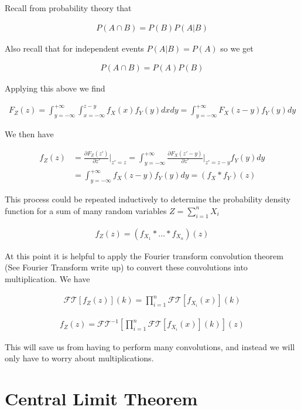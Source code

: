 \documentclass[12pt]{article}
\begin{document}
Recall from probability theory that

\begin{align}
P(A \cap B) = P(B)P(A\vert B)
\end{align}

Also recall that for independent events $P(A\vert B) = P(A)$ so we get

\begin{align}
P(A \cap B) = P(A)P(B)
\end{align}

Applying this above we find

\begin{align}
F_Z(z) = \int_{y=-\infty}^{+\infty}\int_{x=-\infty}^{z-y}f_X(x)f_Y(y)dxdy = \int_{y=-\infty}^{+\infty}F_X(z-y)f_Y(y)dy
\end{align}

We then have

\begin{align}
f_Z(z) &= \frac{\partial F_Z(z')}{\partial z'}\Bigg\vert_{z'=z} = \int_{y=-\infty}^{+\infty}\frac{\partial F_X(z'-y)}{\partial z'}\Bigg \vert_{z'=z-y}f_Y(y) dy\\
&= \int_{y=-\infty}^{+\infty} f_X(z-y)f_Y(y) dy = (f_X \ast f_Y)(z)
\end{align}

This process could be repeated inductively to determine the probability density function for a sum of many random variables $Z = \sum_{i=1}^n X_i$

\begin{align}
f_Z(z) = \left(f_{X_1} \ast \ldots \ast f_{X_n}\right)(z)
\end{align}

At this point it is helpful to apply the Fourier transform convolution theorem (See Fourier Transform write up) to convert these convolutions into multiplication. We have

\begin{align}
\mathcal{FT}[f_Z(z)](k) = \prod_{i=1}^n \mathcal{FT}[f_{X_i}(x)](k)
\end{align}

\begin{align}
f_Z(z) = \mathcal{FT}^{-1}\left[\prod_{i=1}^n \mathcal{FT}[f_{X_i}(x)](k) \right](z)
\end{align}

This will save us from having to perform many convolutions, and instead we will only have to worry about multiplications.

\section{Central Limit Theorem}
\end{document}
